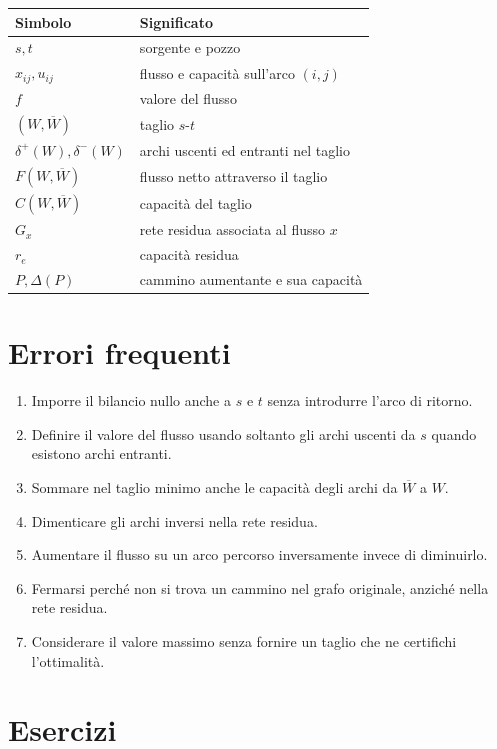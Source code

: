 \documentclass[11pt,a4paper]{article}
\newcommand{\Wbar}{\overline W}
\begin{document}
\begin{notationbox}
\begin{center}
\begin{tabular}{ll}
\toprule
Simbolo & Significato\\
\midrule
$s,t$ & sorgente e pozzo\\
$x_{ij},u_{ij}$ & flusso e capacità sull'arco $(i,j)$\\
$f$ & valore del flusso\\
$(W,\Wbar)$ & taglio $s$-$t$\\
$\delta^+(W),\delta^-(W)$ & archi uscenti ed entranti nel taglio\\
$F(W,\Wbar)$ & flusso netto attraverso il taglio\\
$C(W,\Wbar)$ & capacità del taglio\\
$G_x$ & rete residua associata al flusso $x$\\
$r_e$ & capacità residua\\
$P,\Delta(P)$ & cammino aumentante e sua capacità\\
\bottomrule
\end{tabular}
\end{center}
\end{notationbox}

\section{Errori frequenti}
\begin{enumerate}
\item Imporre il bilancio nullo anche a $s$ e $t$ senza introdurre l'arco di ritorno.
\item Definire il valore del flusso usando soltanto gli archi uscenti da $s$ quando esistono archi entranti.
\item Sommare nel taglio minimo anche le capacità degli archi da $\Wbar$ a $W$.
\item Dimenticare gli archi inversi nella rete residua.
\item Aumentare il flusso su un arco percorso inversamente invece di diminuirlo.
\item Fermarsi perché non si trova un cammino nel grafo originale, anziché nella rete residua.
\item Considerare il valore massimo senza fornire un taglio che ne certifichi l'ottimalità.
\end{enumerate}

\section{Esercizi}
\end{document}
